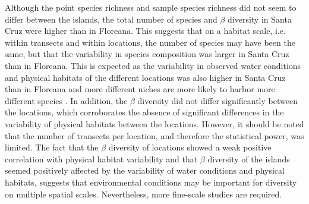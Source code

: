 Although the point species richness and sample species richness did not seem to differ between the islands, the total number of species and $\beta$ diversity in Santa Cruz were higher than in Floreana. This suggests that on a habitat scale, i.e. within transects and within locations, the number of species may have been the same, but that the variability in species composition was larger in Santa Cruz than in Floreana. This is expected as the variability in observed water conditions and physical habitats of the different locations was also higher in Santa Cruz than in Floreana and more different niches are more likely to harbor more different species \citep{Elith2009,Guisan2000}. In addition, the $\beta$ diversity did not differ significantly between the locations, which corroborates the absence of significant differences in the variability of physical habitats between the locations. However, it should be noted that the number of transects per location, and therefore the statistical power, was limited. The fact that the $\beta$ diversity of locations showed a weak positive correlation with physical habitat variability and that $\beta$ diversity of the islands seemed positively affected by the variability of water conditions and physical habitats, suggests that environmental conditions may be important for diversity on multiple spatial scales. Nevertheless, more fine-scale studies are required.

